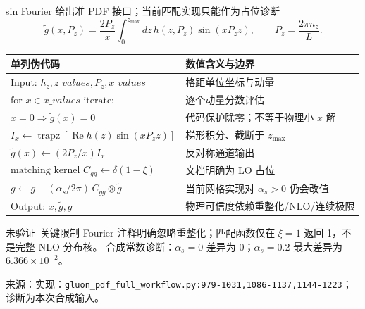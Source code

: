 \documentclass[UTF8,aspectratio=169,11pt]{ctexbeamer}
\newcommand{\source}[1]{%
  \vspace{0.06em}\par{\raggedright\scriptsize\color{muted}来源：#1\par}}
\newcommand{\unverified}{\textcolor{warning}{未验证}}
\newcommand{\codepath}[1]{\nolinkurl{#1}}
\begin{document}
\begin{frame}[t]{sin Fourier 给出准 PDF 接口；当前匹配实现只能作为占位诊断}
  \begin{equation*}
    \widetilde g(x,P_z)=\frac{2P_z}{x}\int_0^{z_{\max}}
    dz\,h(z,P_z)\sin(xP_z z),
    \qquad P_z=\frac{2\pi n_z}{L}.
  \end{equation*}
  \begin{center}
    \scriptsize
    \begin{tabularx}{0.94\textwidth}{@{}lY@{}}
      \toprule
      单列伪代码 & 数值含义与边界 \\
      \midrule
      \(\text{Input: }h_z,z\_values,P_z,x\_values\) & 格距单位坐标与动量 \\
      \(\text{for }x\in x\_values\text{ iterate:}\) & 逐个动量分数评估 \\
      \quad \(x=0\Rightarrow \widetilde g(x)=0\) & 代码保护除零；不等于物理小 \(x\) 解 \\
      \quad \(I_x\gets\operatorname{trapz}[\operatorname{Re}h(z)\sin(xP_z z)]\) & 梯形积分、截断于 \(z_{\max}\) \\
      \quad \(\widetilde g(x)\gets(2P_z/x)I_x\) & 反对称通道输出 \\
      \(\text{matching kernel }C_{gg}\gets\delta(1-\xi)\) & 文档明确为 LO 占位 \\
      \(g\gets\widetilde g-(\alpha_s/2\pi)\,C_{gg}\otimes\widetilde g\) & 当前网格实现对 \(\alpha_s>0\) 仍会改值 \\
      \(\text{Output: }x,\widetilde g,g\) & 物理可信度依赖重整化/NLO/连续极限 \\
      \bottomrule
    \end{tabularx}
  \end{center}
  \begin{block}{\unverified\ 关键限制}
    \footnotesize
    Fourier 注释明确忽略重整化；匹配函数仅在 \(\xi=1\) 返回 1，不是完整 NLO 分布核。
    合成常数诊断：\(\alpha_s=0\) 差异为 0；\(\alpha_s=0.2\) 最大差异为 \(6.366\times10^{-2}\)。
  \end{block}
  \source{实现：\codepath{gluon_pdf_full_workflow.py:979-1031,1086-1137,1144-1223}；诊断为本次合成输入。}
\end{frame}
\end{document}
